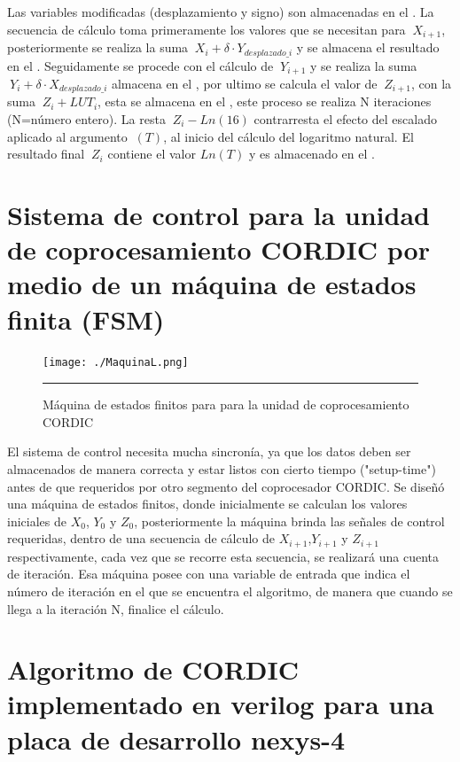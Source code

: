 Las variables modificadas (desplazamiento y signo) son almacenadas en el .
La secuencia de cálculo toma primeramente los valores que se necesitan para  $\ X_{i+1} $, posteriormente se realiza la suma $\ X_{i} +  \delta \cdot Y_{desplazado\_i} $ y se almacena el resultado en el . Seguidamente se procede con el cálculo de $\ Y_{i+1} $ y se realiza la suma $\ Y_{i} +  \delta \cdot X_{desplazado\_i} $ almacena en el , por ultimo se calcula el valor de $\ Z_{i+1} $, con la suma $\ Z_{i} +  LUT_i $, esta se almacena en el , este proceso se realiza N iteraciones (N=número entero). La resta  $\ Z_i - Ln\left(16\right) $ contrarresta el efecto del escalado aplicado al argumento $\ \left(T\right) $, al inicio del cálculo del logaritmo natural. El resultado final $\ Z_i $ contiene el valor $Ln \left(T \right)$ y es almacenado en el .

\section{Sistema de control para la unidad de coprocesamiento CORDIC por medio de un máquina de estados finita (FSM)}

\begin{figure}[H]
  \centering
    \texttt{[image: ./MaquinaL.png]}
    \rule{35em}{0.5pt}
  \caption[Máquina de estados finitos para para la unidad de coprocesamiento CORDIC]{Máquina de estados finitos para para la unidad de coprocesamiento CORDIC}
  \label{fig:FSML}
\end{figure}

El sistema de control necesita mucha sincronía, ya que los datos deben ser almacenados de manera correcta y estar listos con cierto tiempo ("setup-time") antes de que requeridos por otro segmento del coprocesador CORDIC. Se diseñó una máquina de estados finitos, donde inicialmente se calculan los valores iniciales de $ X_0 $, $ Y_0 $ y $ Z_0 $, posteriormente la máquina brinda las señales de control requeridas, dentro de una secuencia de cálculo de $ X_{i+1} $,$ Y_{i+1} $ y $ Z_{i+1} $ respectivamente, cada vez que se recorre esta secuencia, se realizará una cuenta de iteración. Esa máquina posee con una variable de entrada que indica el número de iteración en el que se encuentra el algoritmo, de manera que cuando se llega a la iteración N, finalice el cálculo.

\section{Algoritmo de CORDIC implementado en verilog para una placa de desarrollo nexys-4}


